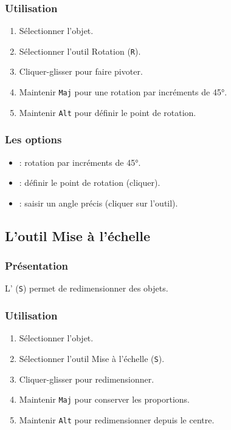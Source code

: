 \subsubsection{Utilisation}

\begin{enumerate}
    \item Sélectionner l'objet.
    \item Sélectionner l'outil Rotation (\texttt{R}).
    \item Cliquer-glisser pour faire pivoter.
    \item Maintenir \texttt{Maj} pour une rotation par incréments de 45°.
    \item Maintenir \texttt{Alt} pour définir le point de rotation.
\end{enumerate}

\subsubsection{Les options}

\begin{itemize}
    \item {} : rotation par incréments de 45°.
    \item {} : définir le point de rotation (cliquer).
    \item {} : saisir un angle précis (cliquer sur l'outil).
\end{itemize}

\subsection{L'outil Mise à l'échelle}

\subsubsection{Présentation}

L' (\texttt{S}) permet de redimensionner des objets.

\subsubsection{Utilisation}

\begin{enumerate}
    \item Sélectionner l'objet.
    \item Sélectionner l'outil Mise à l'échelle (\texttt{S}).
    \item Cliquer-glisser pour redimensionner.
    \item Maintenir \texttt{Maj} pour conserver les proportions.
    \item Maintenir \texttt{Alt} pour redimensionner depuis le centre.
\end{enumerate}


